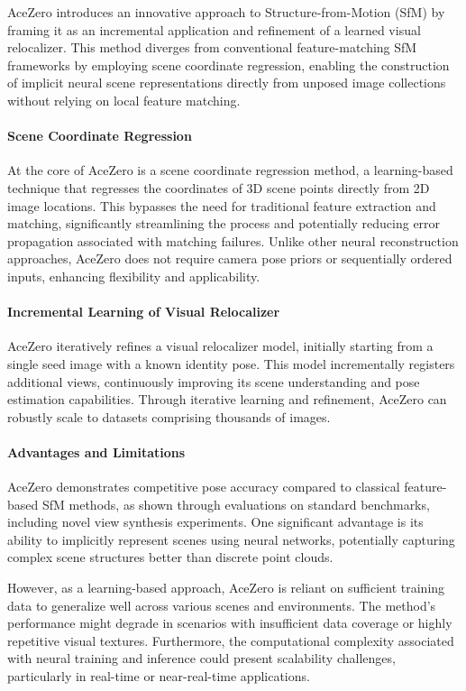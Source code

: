AceZero \cite{brachmann2024acezero} introduces an innovative approach to Structure-from-Motion (SfM) by framing it as an incremental application and refinement of a learned visual relocalizer. 
This method diverges from conventional feature-matching SfM frameworks by employing scene coordinate regression, enabling the construction of implicit neural scene representations directly from unposed image collections without relying on local feature matching.

\paragraph{Scene Coordinate Regression}
At the core of AceZero is a scene coordinate regression method, a learning-based technique that regresses the coordinates of 3D scene points directly from 2D image locations. 
This bypasses the need for traditional feature extraction and matching, significantly streamlining the process and potentially reducing error propagation associated with matching failures. Unlike other neural reconstruction approaches, AceZero does not require camera pose priors or sequentially ordered inputs, enhancing flexibility and applicability.

\paragraph{Incremental Learning of Visual Relocalizer}
AceZero iteratively refines a visual relocalizer model, initially starting from a single seed image with a known identity pose. 
This model incrementally registers additional views, continuously improving its scene understanding and pose estimation capabilities. 
Through iterative learning and refinement, AceZero can robustly scale to datasets comprising thousands of images.

\paragraph{Advantages and Limitations}
AceZero demonstrates competitive pose accuracy compared to classical feature-based SfM methods, as shown through evaluations on standard benchmarks, including novel view synthesis experiments. 
One significant advantage is its ability to implicitly represent scenes using neural networks, potentially capturing complex scene structures better than discrete point clouds.

However, as a learning-based approach, AceZero is reliant on sufficient training data to generalize well across various scenes and environments. 
The method's performance might degrade in scenarios with insufficient data coverage or highly repetitive visual textures. Furthermore, the computational complexity associated with neural training and inference could present scalability challenges, particularly in real-time or near-real-time applications.

